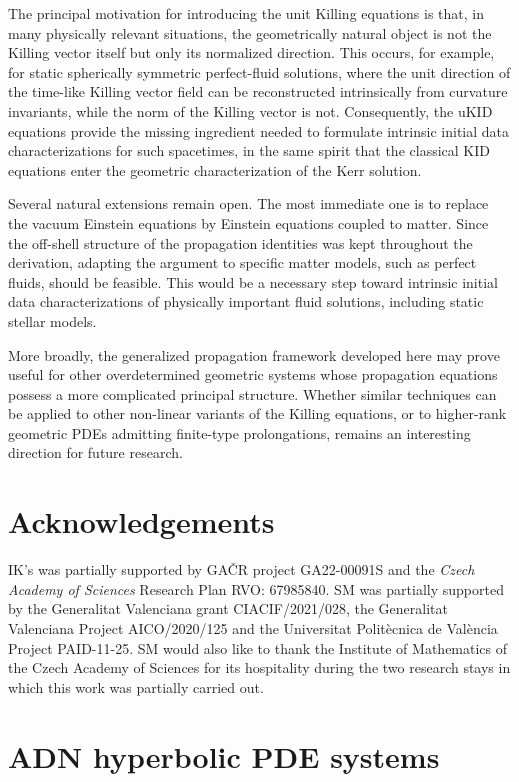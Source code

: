 \documentclass[a4paper]{article}
\theoremstyle{remark}
\begin{document}
The principal motivation for introducing the unit Killing equations is
that, in many physically relevant situations, the geometrically natural
object is not the Killing vector itself but only its normalized
direction. This occurs, for example, for static spherically symmetric perfect-fluid solutions,
where the unit direction of the time-like Killing vector field can be reconstructed intrinsically from curvature invariants, while the norm of the Killing vector is not. Consequently, the uKID equations
provide the missing ingredient needed to formulate intrinsic initial
data characterizations for such spacetimes, in the same spirit that the
classical KID equations enter the geometric characterization of the Kerr
solution.

Several natural extensions remain open. The most immediate one is to
replace the vacuum Einstein equations by Einstein equations coupled to
matter. Since the off-shell structure of the propagation identities was
kept throughout the derivation, adapting the argument to specific matter
models, such as perfect fluids, should be feasible. This would be a
necessary step toward intrinsic initial data characterizations of
physically important fluid solutions, including static stellar
models.

More broadly, the generalized propagation framework developed here may
prove useful for other overdetermined geometric systems whose
propagation equations possess a more complicated principal structure.
Whether similar techniques can be applied to other non-linear variants
of the Killing equations, or to higher-rank geometric PDEs admitting
finite-type prolongations, remains an interesting direction for future
research.

\section*{Acknowledgements}
IK's was partially supported by GA\v{C}R project GA22-00091S and the \emph{Czech Academy of Sciences} Research Plan RVO: 67985840. SM was partially supported by the Generalitat Valenciana grant CIACIF/2021/028, the Generalitat Valenciana Project AICO/2020/125 and the Universitat Polit\`ecnica de Val\`encia Project PAID-11-25. SM would also like to thank the Institute of Mathematics of the Czech Academy of Sciences for its hospitality during the two research stays in which this work was partially carried out.

\appendix

\section{ADN hyperbolic PDE systems} \label{app:adn}
\end{document}
